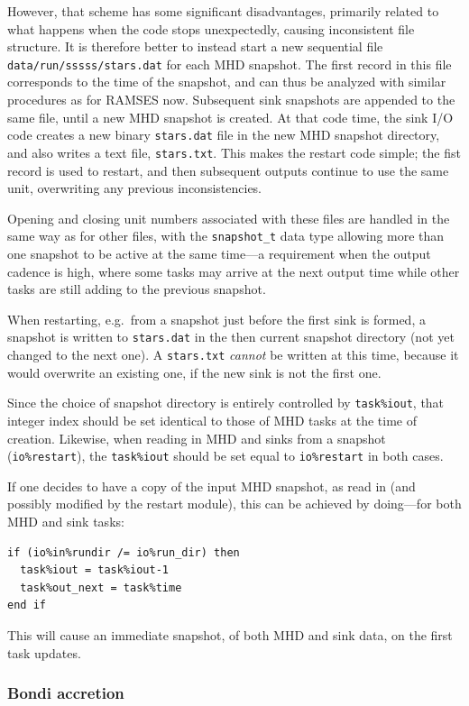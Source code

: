\documentclass[paper=a4,fontsize=11pt]{scrartcl}
\numberwithin{equation}{section}		%
\numberwithin{figure}{section}			%
\numberwithin{table}{section}				%
\newcommand{\codecolor}{\color{Blue}}
\newcommand{\Code}[1]{{\codecolor\texttt{#1}}}
\begin{document}
However, that scheme has some significant disadvantages, primarily related to what happens when the code stops unexpectedly, causing inconsistent file structure. It is therefore better to instead start a new sequential file \Code{data/run/sssss/stars.dat} for each MHD snapshot.  The first record in this file corresponds to the time of the snapshot, and can thus be analyzed with similar procedures as for RAMSES now.  Subsequent sink snapshots are appended to the same file, until a new MHD snapshot is created.  At that code time, the sink I/O code creates a new binary \Code{stars.dat} file in the new MHD snapshot directory, and also writes a text file, \Code{stars.txt}.  This makes the restart code simple; the fist record is used to restart, and then subsequent outputs continue to use the same unit, overwriting any previous inconsistencies.

Opening and closing unit numbers associated with these files are handled in the same way as for other files, with the \Code{snapshot\_t} data type allowing more than one snapshot to be active at the same time---a requirement when the output cadence is high, where some tasks may arrive at the next output time while other tasks are still adding to the previous snapshot.

When restarting, e.g.\ from a snapshot just before the first sink is formed, a snapshot is written to \Code{stars.dat} in the then current snapshot directory (not yet changed to the next one).   A \Code{stars.txt} \textit{cannot} be written at this time, because it would overwrite an existing one, if the new sink is not the first one.

Since the choice of snapshot directory is entirely controlled by \Code{task\%iout}, that integer index should be set identical to those of MHD tasks at the time of creation.   Likewise, when reading in MHD and sinks from a snapshot (\Code{io\%restart}), the \Code{task\%iout} should be set equal to \Code{io\%restart} in both cases.

If one decides to have a copy of the input MHD snapshot, as read in (and possibly modified by the restart module), this can be achieved by doing---for both MHD and sink tasks:
{\small\codecolor\begin{verbatim}
if (io%in%rundir /= io%run_dir) then
  task%iout = task%iout-1
  task%out_next = task%time
end if
\end{verbatim}}
This will cause an immediate snapshot, of both MHD and sink data, on the first task updates.

\subsubsection{Bondi accretion}
\def\vB{v_B}
\def\dB{\rho_B}
\def\rB{r_B}
\def\MB{M_B}
\def\eB{\eta_B}
\def\oB{\omega_B}
\def\OB{\Omega_B}
\end{document}
